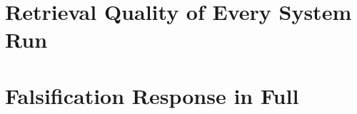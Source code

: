 \documentclass[11pt]{article}
\begin{document}
\appendix

\section{Retrieval Quality of Every System Run}
\label{app:retrieval}

\begin{table}[t]
\centering
{}
\caption{Retrieval quality of every system run. The four above the rule carry the matched comparison; their ranking differs between datasets and their spread is far larger on HotpotQA. jina-embeddings-v3 is reported separately (Appendix~\ref{sec:control}): it sits inside the band on HotpotQA but is the weakest system by ten points on Natural Questions, where it triples the spread and fails TOST equivalence against all four at $\pm$0.02.}
\label{tab:1}
\end{table}

\section{Falsification Response in Full}
\label{app:falsification}
\end{document}
